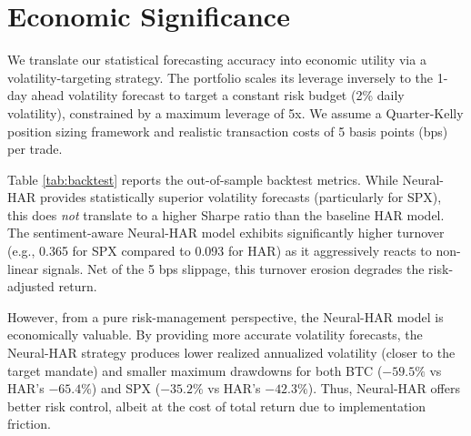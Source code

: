 \section{Economic Significance}
\label{sec:economic}
We translate our statistical forecasting accuracy into economic utility via a volatility-targeting strategy. The portfolio scales its leverage inversely to the 1-day ahead volatility forecast to target a constant risk budget (2\% daily volatility), constrained by a maximum leverage of 5x. We assume a Quarter-Kelly position sizing framework and realistic transaction costs of 5 basis points (bps) per trade.

Table \ref{tab:backtest} reports the out-of-sample backtest metrics. While Neural-HAR provides statistically superior volatility forecasts (particularly for SPX), this does \textit{not} translate to a higher Sharpe ratio than the baseline HAR model. The sentiment-aware Neural-HAR model exhibits significantly higher turnover (e.g., 0.365 for SPX compared to 0.093 for HAR) as it aggressively reacts to non-linear signals. Net of the 5 bps slippage, this turnover erosion degrades the risk-adjusted return.

However, from a pure risk-management perspective, the Neural-HAR model is economically valuable. By providing more accurate volatility forecasts, the Neural-HAR strategy produces lower realized annualized volatility (closer to the target mandate) and smaller maximum drawdowns for both BTC ($-59.5\%$ vs HAR's $-65.4\%$) and SPX ($-35.2\%$ vs HAR's $-42.3\%$). Thus, Neural-HAR offers better risk control, albeit at the cost of total return due to implementation friction.


